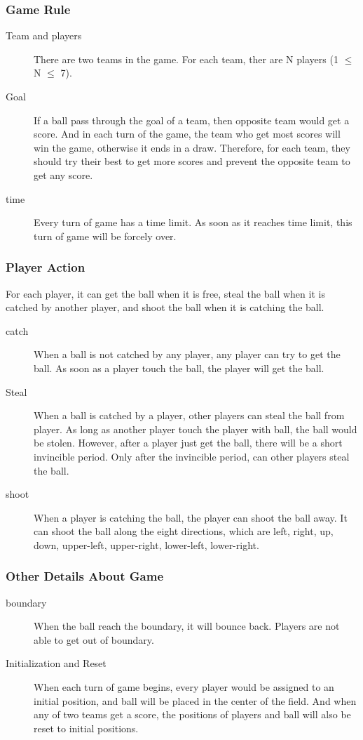 \documentclass[14pt]{extarticle}
\begin{document}
\subsubsection{Game Rule}
\begin{description}
	\item[Team and players]
	There are two teams in the game. For each team, ther are N players (1 $\leq$ N $\leq$ 7).
	\item[Goal]
	If a ball pass through the goal of a team, then opposite team would get a score. And in each turn of the game, the team who get most scores will win the game, otherwise it ends in a draw. Therefore, for each team, they should try their best to get more scores and prevent the opposite team to get any score.
	\item[time]
	Every turn of game has a time limit. As soon as it reaches time limit, this turn of game will be forcely over.
\end{description}

\subsubsection{Player Action}
For each player, it can get the ball when it is free, steal the ball when it is catched by another player, and shoot the ball when it is catching the ball.
\begin{description}
	\item[catch]
	When a ball is not catched by any player, any player can try to get the ball. As soon as a player touch the ball, the player will get the ball.
	\item[Steal]
	When a ball is catched by a player, other players can steal the ball from player. As long as another player touch the player with ball, the ball would be stolen. However, after a player just get the ball, there will be a short invincible period. Only after the invincible period, can other players steal the ball.
	\item[shoot]
	When a player is catching the ball, the player can shoot the ball away. It can shoot the ball along the eight directions, which are left, right, up, down, upper-left, upper-right, lower-left, lower-right.
\end{description}

\subsubsection{Other Details About Game}
\begin{description}
	\item[boundary]
	When the ball reach the boundary, it will bounce back. Players are not able to get out of boundary.
	\item[Initialization and Reset]
	When each turn of game begins, every player would be assigned to an initial position, and ball will be placed in the center of the field. And when any of two teams get a score, the positions of players and ball will also be reset to initial positions.
\end{description}
\end{document}
